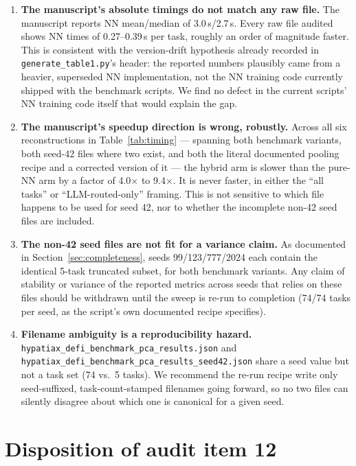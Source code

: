 \documentclass{jmlr}
\begin{document}
\begin{enumerate}

\item \textbf{The manuscript's absolute timings do not match any raw file.}
The manuscript reports NN mean/median of 3.0\,s/2.7\,s. Every raw file
audited shows NN times of 0.27--0.39\,s per task, roughly an order of
magnitude faster. This is consistent with the version-drift hypothesis
already recorded in \texttt{generate\_table1.py}'s header: the reported
numbers plausibly came from a heavier, superseded NN implementation, not
the NN training code currently shipped with the benchmark scripts. We find
no defect in the current scripts' NN training code itself that would
explain the gap.

\item \textbf{The manuscript's speedup direction is wrong, robustly.} Across
all six reconstructions in Table~\ref{tab:timing} --- spanning both
benchmark variants, both seed-42 files where two exist, and both the
literal documented pooling recipe and a corrected version of it --- the
hybrid arm is slower than the pure-NN arm by a factor of 4.0$\times$ to
9.4$\times$. It is never faster, in either the ``all tasks'' or
``LLM-routed-only'' framing. This is not sensitive to which file happens
to be used for seed 42, nor to whether the incomplete non-42 seed files are
included.

\item \textbf{The non-42 seed files are not fit for a variance claim.} As
documented in Section~\ref{sec:completeness}, seeds 99/123/777/2024 each
contain the identical 5-task truncated subset, for both benchmark variants.
Any claim of stability or variance of the reported metrics across seeds
that relies on these files should be withdrawn until the sweep is re-run to
completion (74/74 tasks per seed, as the script's own documented recipe
specifies).

\item \textbf{Filename ambiguity is a reproducibility hazard.}
\texttt{hypatiax\_defi\_benchmark\_pca\_results.json} and
\texttt{hypatiax\_defi\_benchmark\_pca\_results\_seed42.json} share a seed
value but not a task set (74 vs.\ 5 tasks). We recommend the re-run
recipe write only seed-suffixed, task-count-stamped filenames going
forward, so no two files can silently disagree about which one is
canonical for a given seed.

\end{enumerate}

\section{Disposition of audit item 12}
\end{document}
